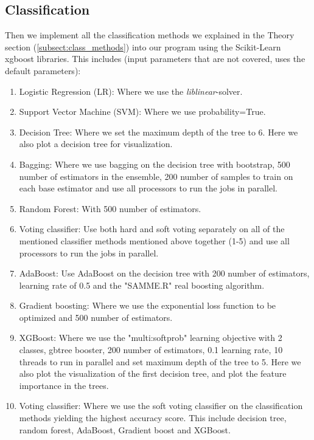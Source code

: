 \documentclass[12pt,a4paper,english]{article}
\begin{document}
\subsection{Classification}
\label{subsect:classif}
Then we implement all the classification methods we explained in the Theory section (\ref{subsect:class_methods}) into our program using the Scikit-Learn xgboost libraries. This includes (input parameters that are not covered, uses the default parameters):
\begin{enumerate}
	\item Logistic Regression (LR): Where we use the \textit{liblinear}-solver.
	\item Support Vector Machine (SVM): Where we use probability=True.
	\item Decision Tree: Where we set the maximum depth of the tree to 6. Here we also plot a decision tree for visualization.
	\item Bagging: Where we use bagging on the decision tree with bootstrap, 500 number of estimators in the ensemble, 200 number of samples to train on each base estimator and use all processors to run the jobs in parallel.
	\item Random Forest: With 500 number of estimators.
	\item Voting classifier: Use both hard and soft voting separately on all of the mentioned classifier methods mentioned above together (1-5) and use all processors to run the jobs in parallel.
	\item AdaBoost: Use AdaBoost on the decision tree with 200 number of estimators, learning rate of 0.5 and the "SAMME.R" real boosting algorithm.
	\item Gradient boosting: Where we use the exponential loss function to be optimized and 500 number of estimators.
	\item XGBoost: Where we use the "multi:softprob" learning objective with 2 classes, gbtree booster, 200 number of estimators, 0.1 learning rate, 10 threads to run in parallel and set maximum depth of the tree to 5. Here we also plot the visualization of the first decision tree, and plot the feature importance in the trees.
	\item Voting classifier: Where we use the soft voting classifier on the classification methods yielding the highest accuracy score. This include decision tree, random forest, AdaBoost, Gradient boost and XGBoost.
\end{enumerate}
\end{document}
